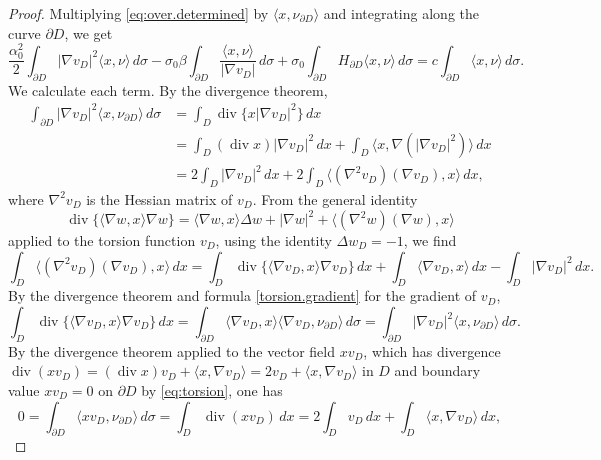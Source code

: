 \documentclass[10pt,reqno,a4paper]{article}
\numberwithin{equation}{section}
\theoremstyle{plain}
\theoremstyle{definition}
\newcommand{\ph}{\varphi}
\newcommand{\la}{\langle}
\newcommand{\ra}{\rangle}
\newcommand{\pa}{\partial}
\renewcommand{\div}{\operatorname{div}} %
\newcommand{\grad}{\nabla}
\begin{document}
\begin{proof} 
Multiplying \eqref{eq:over.determined} by $\la x,\nu_{\pa D}\ra$ 
and integrating along the curve $\pa D$, we get 
\begin{equation} \label{along.01}
\frac{\alpha_0^2}{2} \int_{\pa D} | \nabla v_D|^{2} \la x, \nu \ra \, d\sigma 
- \sigma_0 \beta \int_{\pa D} \frac{ \la x, \nu \ra }{ | \nabla v_D| } \, d\sigma
+ \sigma_0 \int_{\pa D} H_{\pa D} \la x, \nu \ra \, d\sigma
= c \int_{\pa D} \la x, \nu \ra \, d\sigma.
\end{equation}
We calculate each term. 
By the divergence theorem,
\begin{align*}
\int_{\pa D} |\nabla v_D|^2 \la x,\nu_{\pa D} \ra \, d\sigma
& = \int_D \div \{ x |\nabla v_D|^2 \} \, dx 
\\ 
& = \int_D (\div x) |\nabla v_D|^2\, dx 
+ \int_D \la x, \nabla ( |\nabla v_D|^2 ) \ra \, dx
\\ 
& = 2 \int_D |\nabla v_D |^2 \, dx 
+ 2 \int_D \la (\nabla^2 v_D) (\nabla v_D) , x \ra \, dx,
\end{align*}
where $\grad^2 v_D$ is the Hessian matrix of $v_D$. 
From the general identity
\[
\div \{ \la \grad w , x \ra \grad w \} 
= \la \grad w , x \ra \Delta w 
+ |\grad w|^2 
+ \la (\grad^2 w)(\grad w), x \ra
\]
applied to the torsion function $v_D$, using the identity $\Delta w_D = -1$, we find 
\[
\int_D \la (\nabla^2 v_D) (\nabla v_D), x\ra\,dx
= \int_D \div \{ \la \nabla v_D, x \ra \nabla v_D \} \, dx 
+ \int_D \la \nabla v_D, x \ra \, dx 
- \int_D |\nabla v_D|^2 \, dx.
\]
By the divergence theorem and formula \eqref{torsion.gradient} for the gradient of $v_D$,  
\[
\int_D \div \{ \la \nabla v_D, x \ra \nabla v_D \} \, dx 
= \int_{\pa D} \la \nabla v_D, x \ra \la \nabla v_D , \nu_{\pa D} \ra \, d\sigma
= \int_{\pa D} |\nabla v_D|^2 \la x,\nu_{\pa D}\ra \, d\sigma.
\]
By the divergence theorem applied to the vector field $x v_D$, 
which has divergence $\div(x v_D) = (\div x) v_D + \la x, \grad v_D \ra 
= 2 v_D + \la x, \grad v_D \ra$ in $D$ 
and boundary value $x v_D = 0$ on $\pa D$ by \eqref{eq:torsion},    
one has 
\[
0 = \int_{\pa D} \la x v_D , \nu_{\pa D} \ra \, d\sigma 
= \int_D \div(x v_D) \, dx 
= 2 \int_D v_D \, dx + \int_D \la x , \grad v_D \ra \, dx,
\]
\end{proof}
\end{document}
